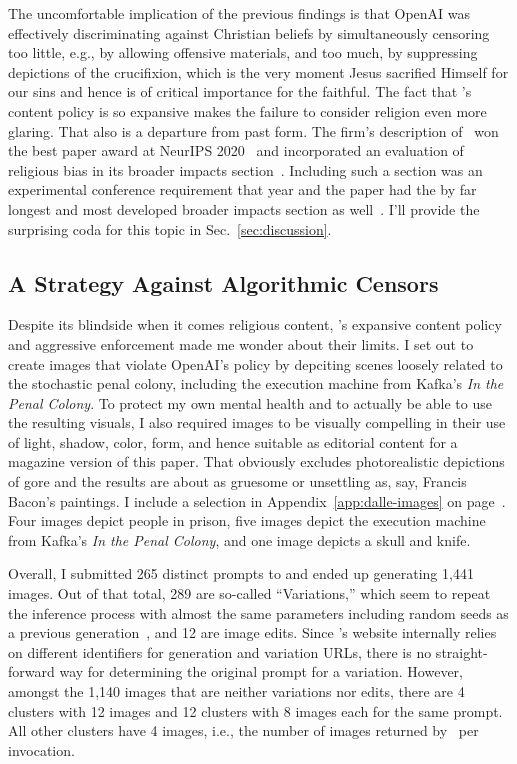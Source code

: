 The uncomfortable implication of the previous findings is that OpenAI was
effectively discriminating against Christian beliefs by simultaneously censoring
too little, e.g., by allowing offensive materials, and too much, by suppressing
depictions of the crucifixion, which is the very moment Jesus sacrified Himself
for our sins and hence is of critical importance for the faithful. The fact that
\DALLE's content policy is so expansive makes the failure to consider religion
even more glaring. That also is a departure from past form. The firm's
description of \GPT\ won the best paper award at NeurIPS
2020~\cite{LinBalcanea2020} and incorporated an evaluation of religious bias in
its broader impacts section~\cite{BrownMannea2020}. Including such a section was
an experimental conference requirement that year and the paper had the by far
longest and most developed broader impacts section as
well~\cite{AshurstHineea2022,PrunklAshurstea2021}. I'll provide the surprising
coda for this topic in Sec.\ \ref{sec:discussion}.


\subsection{A Strategy Against Algorithmic Censors}
\label{sec:strategy}

Despite its blindside when it comes religious content, \DALLE's expansive
content policy and aggressive enforcement made me wonder about their limits. I
set out to create images that violate OpenAI's policy by depciting scenes
loosely related to the stochastic penal colony, including the execution machine
from Kafka's \emph{In the Penal Colony}. To protect my own mental health and to
actually be able to use the resulting visuals, I also required images to be
visually compelling in their use of light, shadow, color, form, and hence
suitable as editorial content for a magazine version of this paper. That
obviously excludes photorealistic depictions of gore and the results are about
as gruesome or unsettling as, say, Francis Bacon's paintings. I include a
selection in Appendix~\ref{app:dalle-images} on
page~\pageref{app:dalle-images}. Four images depict people in prison,
five images depict the execution machine from Kafka's \emph{In the Penal
Colony}, and one image depicts a skull and knife.

Overall, I submitted 265 distinct prompts to \DALLE{} and ended up generating
1,441 images. Out of that total, 289 are so-called ``Variations,'' which seem to
repeat the inference process with almost the same parameters including random
seeds as a previous generation~\cite{Bonzie572022}, and 12 are image edits.
Since \DALLE's website internally relies on different identifiers for generation
and variation URLs, there is no straight-forward way for determining the
original prompt for a variation. However, amongst the 1,140 images that are
neither variations nor edits, there are 4 clusters with 12 images and 12
clusters with 8 images each for the same prompt. All other clusters have 4
images, i.e., the number of images returned by \DALLE\ per invocation.

